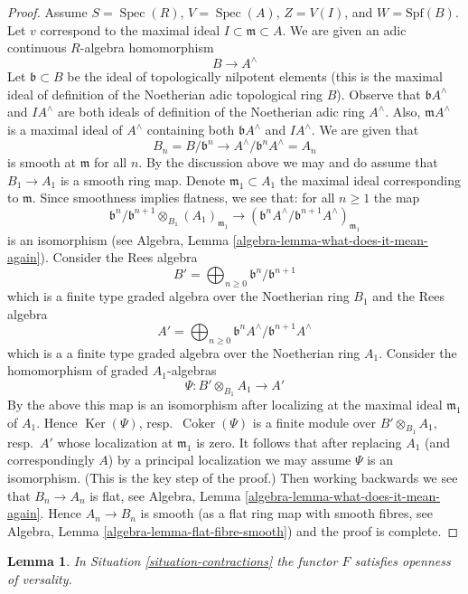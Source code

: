 \documentclass{stacks-project}
\theoremstyle{plain}
\newtheorem{lemma}[subsection]{Lemma}
\theoremstyle{definition}
\theoremstyle{remark}
\numberwithin{equation}{subsection}
\def\Spec{\mathop{\mathrm{Spec}}}
\def\Ker{\mathop{\mathrm{Ker}}}
\def\Coker{\mathop{\mathrm{Coker}}}
\begin{document}
\begin{proof}
\medskip\noindent
Assume $S = \Spec(R)$, $V = \Spec(A)$, $Z = V(I)$, and $W = \text{Spf}(B)$.
Let $v$ correspond to the maximal ideal $I \subset \mathfrak m \subset A$.
We are given an adic continuous $R$-algebra homomorphism
$$
B \longrightarrow A^\wedge
$$
Let $\mathfrak b \subset B$ be the ideal of topologically nilpotent
elements (this is the maximal ideal of definition of the Noetherian adic
topological ring $B$). Observe that $\mathfrak b A^\wedge$ and
$IA^\wedge$ are both ideals of definition of the Noetherian adic
ring $A^\wedge$. Also, $\mathfrak m A^\wedge$ is a maximal ideal
of $A^\wedge$ containing both $\mathfrak b A^\wedge$ and $IA^\wedge$.
We are given that
$$
B_n = B/\mathfrak b^n \to A^\wedge/\mathfrak b^n A^\wedge = A_n
$$
is smooth at $\mathfrak m$ for all $n$. By the discussion above
we may and do assume that $B_1 \to A_1$ is a smooth ring map.
Denote $\mathfrak m_1 \subset A_1$ the maximal ideal corresponding
to $\mathfrak m$. Since smoothness implies flatness, we see that:
for all $n \geq 1$ the map
$$
\mathfrak b^n/\mathfrak b^{n + 1} \otimes_{B_1} (A_1)_{\mathfrak m_1}
\longrightarrow
\left(\mathfrak b^nA^\wedge/\mathfrak b^{n + 1}A^\wedge\right)_{\mathfrak m_1}
$$
is an isomorphism (see
Algebra, Lemma \ref{algebra-lemma-what-does-it-mean-again}).
Consider the Rees algebra
$$
B' = \bigoplus\nolimits_{n \geq 0} \mathfrak b^n/\mathfrak b^{n + 1}
$$
which is a finite type graded algebra over the Noetherian ring $B_1$ and
the Rees algebra
$$
A' = \bigoplus\nolimits_{n \geq 0}
\mathfrak b^nA^\wedge/\mathfrak b^{n + 1}A^\wedge
$$
which is a a finite type graded algebra over the Noetherian ring $A_1$.
Consider the homomorphism of graded $A_1$-algebras
$$
\Psi : B' \otimes_{B_1} A_1 \longrightarrow A'
$$
By the above this map is an isomorphism after localizing at
the maximal ideal $\mathfrak m_1$ of $A_1$.
Hence $\Ker(\Psi)$, resp.\ $\Coker(\Psi)$ is a finite module
over $B' \otimes_{B_1} A_1$, resp.\ $A'$ whose localization
at $\mathfrak m_1$ is zero. It follows that after replacing
$A_1$ (and correspondingly $A$) by a principal localization
we may assume $\Psi$ is an isomorphism. (This is the key step of the proof.)
Then working backwards we see that $B_n \to A_n$ is flat, see
Algebra, Lemma \ref{algebra-lemma-what-does-it-mean-again}.
Hence $A_n \to B_n$ is smooth (as a flat ring map with smooth
fibres, see Algebra, Lemma \ref{algebra-lemma-flat-fibre-smooth})
and the proof is complete.
\end{proof}

\begin{lemma}
\label{lemma-openness-versality}
In Situation \ref{situation-contractions} the functor
$F$ satisfies openness of versality.
\end{lemma}
\end{document}
